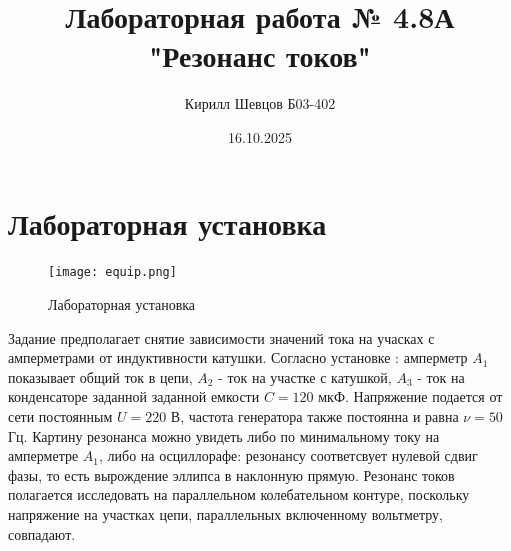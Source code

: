 \documentclass[a4paper, 12pt]{article}
\title{Лабораторная работа № 4.8А "Резонанс токов"}
\author{Кирилл Шевцов Б03-402}
\date{16.10.2025}
\begin{document}
\maketitle
\section*{Лабораторная установка}
\begin{figure}[htbp]
    \centering
    \texttt{[image: equip.png]}
    \label{Лабораторная установка}
    \caption{Лабораторная установка}
\end{figure}
Задание предполагает снятие зависимости значений тока на учасках с амперметрами от индуктивности катушки.
Согласно установке : амперметр $A_{1}$ показывает общий ток в цепи, $A_{2}$ - ток на участке с катушкой, $A_{3}$ - ток на конденсаторе заданной
заданной емкости $C = 120$ мкФ.\newline
Напряжение подается от сети постоянным $U = 220$ В, частота генератора также постоянна и равна $\nu = 50$ Гц.\newline
Картину резонанса можно увидеть либо по минимальному току на амперметре $A_{1}$, либо на осциллорафе: резонансу соответсвует нулевой сдвиг фазы,
то есть вырождение эллипса в наклонную прямую.\newline
Резонанс токов полагается исследовать на параллельном колебательном контуре, поскольку напряжение на участках цепи, параллельных включенному
вольтметру, совпадают.
\end{document}
